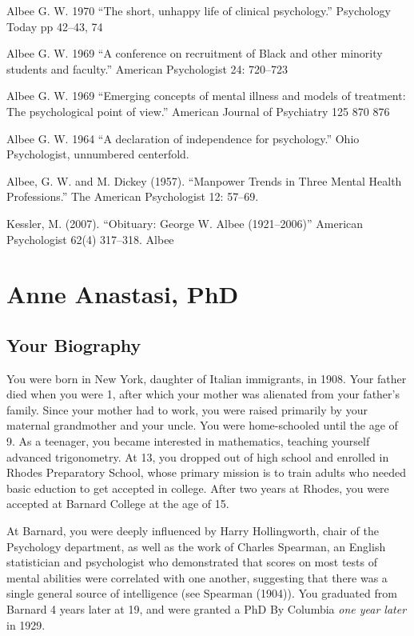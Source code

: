 \begin{refsection}
Albee G. W. 1970 “The short, unhappy life of clinical psychology.” Psychology Today pp 42--43, 74

Albee G. W. 1969 “A conference on recruitment of Black and other minority students and faculty.” American Psychologist 24: 720--723

Albee G. W. 1969 “Emerging concepts of mental illness and models of treatment: The psychological point of view.” American Journal of Psychiatry 125 870 876

Albee G. W. 1964 “A declaration of independence for psychology.” Ohio Psychologist, unnumbered centerfold.

Albee, G. W. and M. Dickey (1957). ``Manpower Trends in Three Mental Health Professions.'' The American Psychologist 12: 57--69.

Kessler, M. (2007). “Obituary: George W. Albee (1921--2006)” American Psychologist 62(4) 317--318.
Albee

\chapter{Anne Anastasi, PhD}
\label{anneanastasiphd}

\section{Your Biography}
\label{yourbiography}

You were born in New York, daughter of Italian immigrants, in 1908. Your father died when you were 1, after which your mother was alienated from your father's family. Since your mother had to work, you were raised primarily by your maternal grandmother and your uncle. You were home-schooled until the age of 9. As a teenager, you became interested in mathematics, teaching yourself advanced trigonometry. At 13, you dropped out of high school and enrolled in Rhodes Preparatory School, whose primary mission is to train adults who needed basic eduction to get accepted in college. After two years at Rhodes, you were accepted at Barnard College at the age of 15.

At Barnard, you were deeply influenced by Harry Hollingworth, chair of the Psychology department, as well as the work of Charles Spearman, an English statistician and psychologist who demonstrated that scores on most tests of mental abilities were correlated with one another, suggesting that there was a single general source of intelligence (see Spearman (1904)). You graduated from Barnard 4 years later at 19, and were granted a PhD By Columbia \emph{one year later} in 1929.


\end{refsection}
